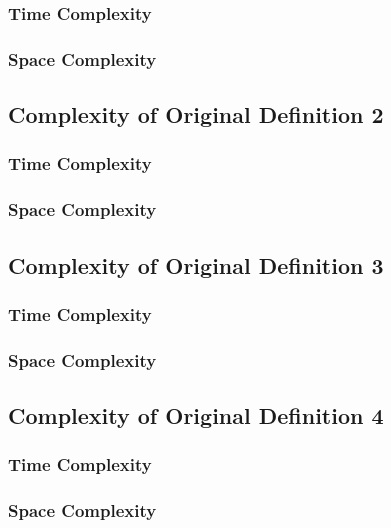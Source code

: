 \documentclass[conference]{IEEEtran}
\begin{document}
\subsubsection{Time Complexity}

\subsubsection{Space Complexity}

\subsection{Complexity of Original Definition 2}

\subsubsection{Time Complexity}

\subsubsection{Space Complexity}

\subsection{Complexity of Original Definition 3}

\subsubsection{Time Complexity}

\subsubsection{Space Complexity}

\subsection{Complexity of Original Definition 4}

\subsubsection{Time Complexity}

\subsubsection{Space Complexity}
\end{document}

